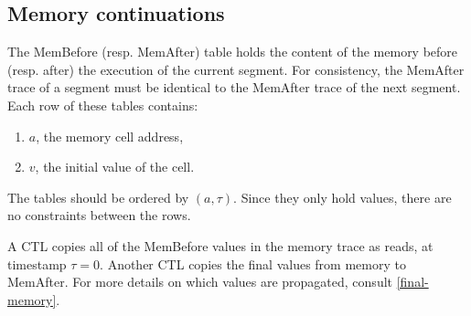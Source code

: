 \subsection{Memory continuations}
\label{mem-continuations}

The MemBefore (resp. MemAfter) table holds the content of the memory before (resp. after) the execution of the current segment.
For consistency, the MemAfter trace of a segment must be identical to the MemAfter trace of the next segment.
Each row of these tables contains:

\begin{enumerate}
  \item $a$, the memory cell address,
  \item $v$, the initial value of the cell.
\end{enumerate}
The tables should be ordered by $(a, \tau)$. Since they only hold values, there are no constraints between the rows.

A CTL copies all of the MemBefore values in the memory trace as reads, at timestamp $\tau = 0$.
Another CTL copies the final values from memory to MemAfter. For more details on which values are propagated, consult \ref{final-memory}.
